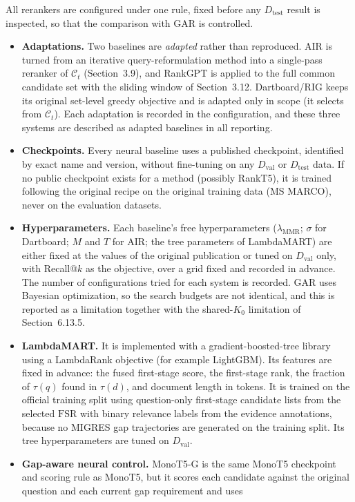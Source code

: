 \documentclass[11pt,a4paper]{article}
\begin{document}
All rerankers are configured under one rule, fixed before any $D_{\mathrm{test}}$ result is inspected, so that the comparison with GAR is controlled.

\begin{itemize}[leftmargin=1.5em]
\item \textbf{Adaptations.} Two baselines are \emph{adapted} rather than reproduced. AIR is turned from an iterative query-reformulation method into a single-pass reranker of $\mathcal{C}_t$ (Section~3.9), and RankGPT is applied to the full common candidate set with the sliding window of Section~3.12. Dartboard/RIG keeps its original set-level greedy objective and is adapted only in scope (it selects from $\mathcal{C}_t$). Each adaptation is recorded in the configuration, and these three systems are described as adapted baselines in all reporting.
\item \textbf{Checkpoints.} Every neural baseline uses a published checkpoint, identified by exact name and version, without fine-tuning on any $D_{\mathrm{val}}$ or $D_{\mathrm{test}}$ data. If no public checkpoint exists for a method (possibly RankT5), it is trained following the original recipe on the original training data (MS MARCO), never on the evaluation datasets.
\item \textbf{Hyperparameters.} Each baseline's free hyperparameters ($\lambda_{\mathrm{MMR}}$; $\sigma$ for Dartboard; $M$ and $T$ for AIR; the tree parameters of LambdaMART) are either fixed at the values of the original publication or tuned on $D_{\mathrm{val}}$ only, with Recall@$k$ as the objective, over a grid fixed and recorded in advance. The number of configurations tried for each system is recorded. GAR uses Bayesian optimization, so the search budgets are not identical, and this is reported as a limitation together with the shared-$K_0$ limitation of Section~6.13.5.
\item \textbf{LambdaMART.} It is implemented with a gradient-boosted-tree library using a LambdaRank objective (for example LightGBM). Its features are fixed in advance: the fused first-stage score, the first-stage rank, the fraction of $\tau(q)$ found in $\tau(d)$, and document length in tokens. It is trained on the official training split using question-only first-stage candidate lists from the selected $\mathrm{FSR}$ with binary relevance labels from the evidence annotations, because no MIGRES gap trajectories are generated on the training split. Its tree hyperparameters are tuned on $D_{\mathrm{val}}$.
\item \textbf{Gap-aware neural control.} MonoT5-G is the same MonoT5 checkpoint and scoring rule as MonoT5, but it scores each candidate against the original question and each current gap requirement and uses

\end{itemize}
\end{document}
